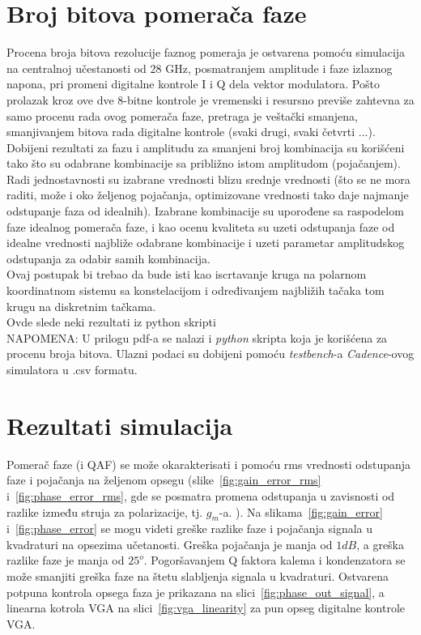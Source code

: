 \documentclass[journal,twocolumn,letterpaper]{IEEEJERM}
\begin{document}
\section{Broj bitova pomerača faze}

Procena broja bitova rezolucije faznog pomeraja je ostvarena pomoću simulacija na centralnoj učestanosti od $28$ GHz, posmatranjem amplitude i faze izlaznog napona, pri promeni digitalne kontrole I i Q dela vektor modulatora. Pošto prolazak kroz ove dve 8-bitne kontrole je vremenski i resursno previše zahtevna za samo procenu rada ovog pomerača faze, pretraga je veštački smanjena, smanjivanjem bitova rada digitalne kontrole (svaki drugi, svaki četvrti ...). Dobijeni rezultati za fazu i amplitudu  za smanjeni broj kombinacija su korišćeni tako što su odabrane kombinacije sa približno istom amplitudom (pojačanjem). Radi jednostavnosti su izabrane vrednosti blizu srednje vrednosti (što se ne mora raditi, može i oko željenog pojačanja, optimizovane vrednosti tako daje najmanje odstupanje faza od idealnih). Izabrane kombinacije su uporođene sa raspodelom faze idealnog pomerača faze, i kao ocenu kvaliteta su uzeti odstupanja faze od idealne vrednosti najbliže odabrane kombinacije i uzeti parametar amplitudskog odstupanja za odabir samih kombinacija. \\

Ovaj postupak bi trebao da bude isti kao iscrtavanje kruga na polarnom koordinatnom sistemu sa konstelacijom i određivanjem najbližih tačaka tom krugu na diskretnim tačkama. \\

Ovde slede neki rezultati iz python skripti \\

NAPOMENA: U prilogu pdf-a se nalazi i \textit{python} skripta koja je korišćena za procenu broja bitova. Ulazni podaci su dobijeni pomoću \textit{testbench}-a \textit{Cadence}-ovog simulatora u .csv formatu.

\section{Rezultati simulacija}

Pomerač faze (i QAF) se može okarakterisati i pomoću rms vrednosti odstupanja faze i pojačanja na željenom opsegu (slike~\ref{fig:gain_error_rms} i~\ref{fig:phase_error_rms}, gde se posmatra promena odstupanja u zavisnosti od razlike između struja za polarizacije, tj. $g_m$-a. ).
Na slikama~\ref{fig:gain_error} i~\ref{fig:phase_error} se mogu videti greške razlike faze i pojačanja signala u kvadraturi na opsezima učetanosti. Greška pojačanja je manja od $1 dB$, a greška razlike faze je manja od $25^o$. Pogoršavanjem Q faktora kalema i kondenzatora se može smanjiti greška faze na štetu slabljenja signala u kvadraturi.  
Ostvarena potpuna kontrola opsega faza je prikazana na slici~\ref{fig:phase_out_signal}, a linearna kotrola VGA na slici~\ref{fig:vga_linearity} za pun opseg digitalne kontrole VGA. \\
\end{document}
